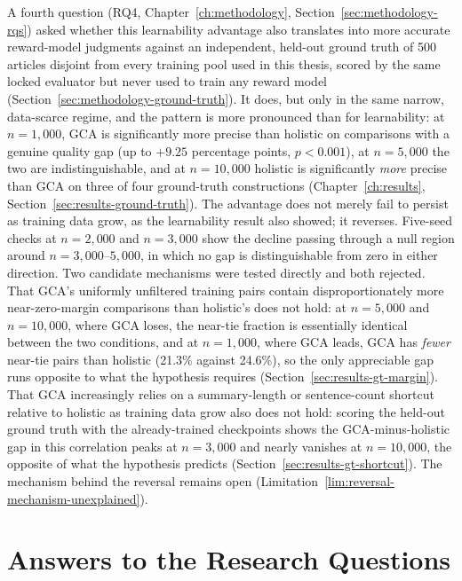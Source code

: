 A fourth question (RQ4, Chapter~\ref{ch:methodology},
Section~\ref{sec:methodology-rqs}) asked whether this learnability advantage
also translates into more accurate reward-model judgments against an
independent, held-out ground truth of 500 articles disjoint from every
training pool used in this thesis, scored by the same locked evaluator but
never used to train any reward model
(Section~\ref{sec:methodology-ground-truth}). It does, but only in the same
narrow, data-scarce regime, and the pattern is more pronounced than for
learnability: at $n=1{,}000$, GCA is significantly more precise than holistic
on comparisons with a genuine quality gap (up to $+9.25$ percentage points,
$p<0.001$), at $n=5{,}000$ the two are indistinguishable, and at $n=10{,}000$
holistic is significantly \emph{more} precise than GCA on three of four
ground-truth constructions
(Chapter~\ref{ch:results}, Section~\ref{sec:results-ground-truth}). The
advantage does not merely fail to persist as training data grow, as the
learnability result also showed; it reverses. Five-seed checks at
$n=2{,}000$ and $n=3{,}000$ show the decline passing through a null region
around $n=3{,}000$--$5{,}000$, in which no gap is distinguishable from zero
in either direction. Two candidate mechanisms were tested directly and both
rejected. That GCA's uniformly unfiltered training pairs contain
disproportionately more near-zero-margin comparisons than holistic's does
not hold: at $n=5{,}000$ and $n=10{,}000$, where GCA loses, the near-tie
fraction is essentially identical between the two conditions, and at
$n=1{,}000$, where GCA leads, GCA has \emph{fewer} near-tie pairs than
holistic (21.3\% against 24.6\%), so the only appreciable gap runs opposite
to what the hypothesis requires
(Section~\ref{sec:results-gt-margin}). That GCA increasingly relies on a
summary-length or sentence-count shortcut relative to holistic as training
data grow also does not hold: scoring the held-out ground truth with the
already-trained checkpoints shows the GCA-minus-holistic gap in this
correlation peaks at $n=3{,}000$ and nearly vanishes at $n=10{,}000$, the
opposite of what the hypothesis predicts (Section~\ref{sec:results-gt-shortcut}).
The mechanism behind the reversal remains open
(Limitation~\ref{lim:reversal-mechanism-unexplained}).

\section{Answers to the Research Questions}
\label{sec:conclusion-rqs}
\label{sec:concl-rqs}

